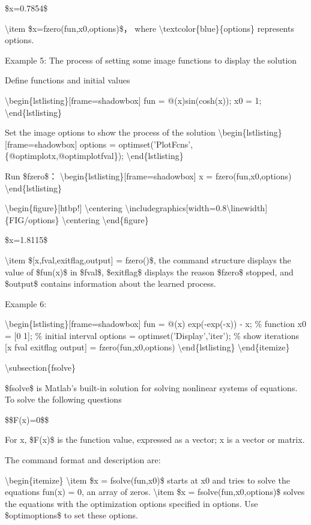 \documentclass[10pt,math=newtx,citestyle=gb7714-2015,bibstyle=gb7714-2015]{elegantbook}
\begin{document}
	\$x=0.7854\$
	
	\textbackslash{}item \$x=fzero(fun,x0,options)\$， where \textbackslash{}textcolor\{blue\}\{options\} represents options.
	
	Example 5: The process of setting some image functions to display the solution
	
	Define functions and initial values
	
	\textbackslash{}begin\{lstlisting\}[frame=shadowbox]
	fun = @(x)sin(cosh(x));
	x0 = 1;
	\textbackslash{}end\{lstlisting\}
	
	Set the image options to show the process of the solution
	\textbackslash{}begin\{lstlisting\}[frame=shadowbox]
	options = optimset('PlotFcns',\{@optimplotx,@optimplotfval\});
	\textbackslash{}end\{lstlisting\}
	
	Run \$fzero\$：
	\textbackslash{}begin\{lstlisting\}[frame=shadowbox]
	x = fzero(fun,x0,options)
	\textbackslash{}end\{lstlisting\}
	
	\textbackslash{}begin\{figure\}[htbp!]
	\textbackslash{}centering
	\textbackslash{}includegraphics[width=0.8\textbackslash{}linewidth]\{FIG/options\}
	\textbackslash{}centering
	\textbackslash{}end\{figure\}
	
	\$x=1.8115\$
	
	\textbackslash{}item \$[x,fval,exitflag,output] = fzero()\$, the command structure displays the value of \$fun(x)\$ in \$fval\$, \$exitflag\$ displays the reason \$fzero\$ stopped, and \$output\$ contains information about the learned process.
	
	Example 6: 
	
	\textbackslash{}begin\{lstlisting\}[frame=shadowbox]
	fun = @(x) exp(-exp(-x)) - x; \% function
	x0 = [0 1]; \% initial interval
	options = optimset('Display','iter'); \% show iterations
	[x fval exitflag output] = fzero(fun,x0,options)
	\textbackslash{}end\{lstlisting\}
	\textbackslash{}end\{itemize\}
	
	\textbackslash{}subsection\{fsolve\}
	
	\$fsolve\$ is Matlab's built-in solution for solving nonlinear systems of equations. To solve the following questions
	
	\$\$F(x)=0\$\$
	
	For x, \$F(x)\$ is the function value, expressed as a vector; x is a vector or matrix.
	
	The command format and description are:
	
	\textbackslash{}begin\{itemize\}
	\textbackslash{}item \$x = fsolve(fun,x0)\$ starts at x0 and tries to solve the equations fun(x) = 0, an array of zeros.
	\textbackslash{}item \$x = fsolve(fun,x0,options)\$ solves the equations with the optimization options specified in options. Use \$optimoptions\$ to set these options.
	
\end{document}
